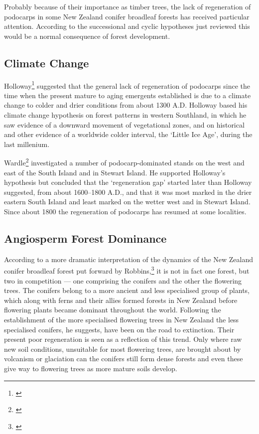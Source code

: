 Probably because of their importance as timber trees, the lack of regeneration of podocarps in some New Zealand conifer broadleaf forests has received particular attention.
According to the successional and cyclic hypotheses just reviewed this would be a normal consequence of forest development.

\subsection{Climate Change}

Holloway\footnote{\cite{holloway1954forests}} suggested that the general lack of regeneration of podocarps since the time when the present mature to aging emergents established is due to a climate change to colder and drier conditions from about 1300 A.D.
Holloway based his climate change hypothesis on forest patterns in western Southland, in which he saw evidence of a downward movement of vegetational zones, and on historical and other evidence of a worldwide colder interval, the `Little Ice Age', during the last millenium.

Wardle\footnote{\cite{wardle1963regeneration}} investigated a number of podocarp-dominated stands on the west and east of the South Island and in Stewart Island.
He supported Holloway's hypothesis but concluded that the `regeneration gap' started later than Holloway suggested, from about 1600--1800 A.D., and that it was most marked in the drier eastern South Island and least marked on the wetter west and in Stewart Island.
Since about 1800 the regeneration of podocarps has resumed at some localities.

\subsection{Angiosperm Forest Dominance}

According to a more dramatic interpretation of the dynamics of the New Zealand conifer broadleaf forest put forward by Robbins,\footnote{\cite{robbins1962podocarp}} it is not in fact one forest, but two in competition --- one comprising the conifers and the other the flowering trees.
The conifers belong to a more ancient and less specialised group of plants, which along with ferns and their allies formed forests in New Zealand before flowering plants became dominant throughout the world.
Following the establishment of the more specialised flowering trees in New Zealand the less specialised conifers, he suggests, have been on the road to extinction.
Their present poor regeneration is seen as a reflection of this trend.
Only where raw new soil conditions, unsuitable for most flowering trees, are brought about by volcanism or glaciation can the conifers still form dense forests and even these give way to flowering trees as more mature soils develop.


